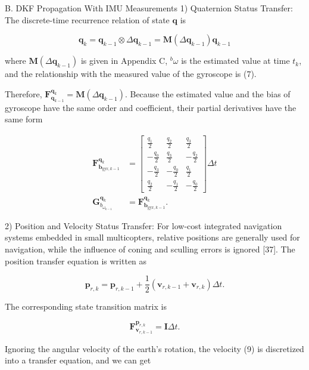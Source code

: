 B. DKF Propagation With IMU Measurements
1) Quaternion Status Transfer: The discrete-time recurrence relation of state $\mathbf{q}$ is

$$
\mathbf{q}_k=\mathbf{q}_{k-1} \otimes \Delta \mathbf{q}_{k-1}=\mathbf{M}\left(\Delta \mathbf{q}_{k-1}\right) \mathbf{q}_{k-1}
$$

where $\mathbf{M}\left(\Delta \mathbf{q}_{k-1}\right)$ is given in Appendix C, ${ }^b \omega$ is the estimated value at time $t_k$, and the relationship with the measured value of the gyroscope is (7).



Therefore, $\mathbf{F}_{\mathbf{q}_{k-1}}^{\mathbf{q}_k}=\mathbf{M}\left(\Delta \mathbf{q}_{k-1}\right)$. Because the estimated value and the bias of gyroscope have the same order and coefficient, their partial derivatives have the same form

$$
\begin{aligned}
\mathbf{F}_{\mathbf{b}_{\mathrm{gyr}, k-1}}^{\mathbf{q}_k} & =\left[\begin{array}{ccc}
\frac{q_1}{2} & \frac{q_2}{2} & \frac{q_3}{2} \\
-\frac{q_0}{2} & \frac{q_3}{2} & -\frac{q_2}{2} \\
-\frac{q_3}{2} & -\frac{q_0}{2} & \frac{q_1}{2} \\
\frac{q_2}{2} & -\frac{q_1}{2} & -\frac{q_0}{2}
\end{array}\right] \Delta t \\
\mathbf{G}_{b_{\omega_{k-1}}}^{\mathbf{q}_k} & =\mathbf{F}_{\mathbf{b}_{\mathrm{gyr}, k-1}}^{\mathbf{q}_k} .
\end{aligned}
$$

2) Position and Velocity Status Transfer: For low-cost integrated navigation systems embedded in small multicopters, relative positions are generally used for navigation, while the influence of coning and sculling errors is ignored [37]. The position transfer equation is written as

$$
\mathbf{p}_{r, k}=\mathbf{p}_{r, k-1}+\frac{1}{2}\left(\mathbf{v}_{r, k-1}+\mathbf{v}_{r, k}\right) \Delta t .
$$


The corresponding state transition matrix is

$$
\mathbf{F}_{\mathbf{v}_{r, k-1}}^{\mathbf{p}_{r, k}}=\mathbf{I} \Delta t .
$$


Ignoring the angular velocity of the earth's rotation, the velocity (9) is discretized into a transfer equation, and we can get

